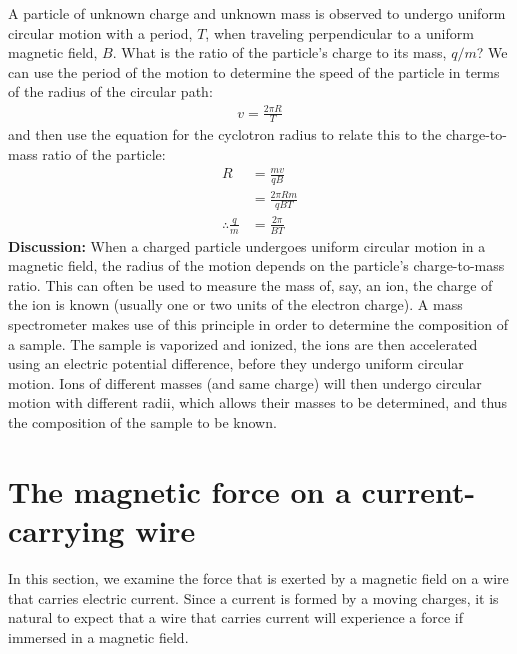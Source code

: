 \begin{example}{\label{ex:magneticforce:massspec}A particle of unknown charge and unknown mass is observed to undergo uniform circular motion with a period, $T$, when traveling perpendicular to a uniform magnetic field, $B$. What is the ratio of the particle's charge to its mass, $q/m$? }
We can use the period of the motion to determine the speed of the particle in terms of the radius of the circular path:
\begin{align*}
v = \frac{2\pi R}{T}
\end{align*}
and then use the equation for the cyclotron radius to relate this to the charge-to-mass ratio of the particle:
\begin{align*}
R &= \frac{mv}{qB}\\
  &= \frac{2\pi R m}{qBT}\\
\therefore \frac{q}{m} &= \frac{2\pi}{BT} 
\end{align*}
\textbf{Discussion:} When a charged particle undergoes uniform circular motion in a magnetic field, the radius of the motion depends on the particle's charge-to-mass ratio. This can often be used to measure the mass of, say, an ion, the charge of the ion is known (usually one or two units of the electron charge). A mass spectrometer makes use of this principle in order to determine the composition of a sample. The sample is vaporized and ionized, the ions are then accelerated using an electric potential difference, before they undergo uniform circular motion. Ions of different masses (and same charge) will then undergo circular motion with different radii, which allows their masses to be determined, and thus the composition of the sample to be known.
\end{example}

\section{The magnetic force on a current-carrying wire}
In this section, we examine the force that is exerted by a magnetic field on a wire that carries electric current. Since a current is formed by a moving charges, it is natural to expect that a wire that carries current will experience a force if immersed in a magnetic field. 


